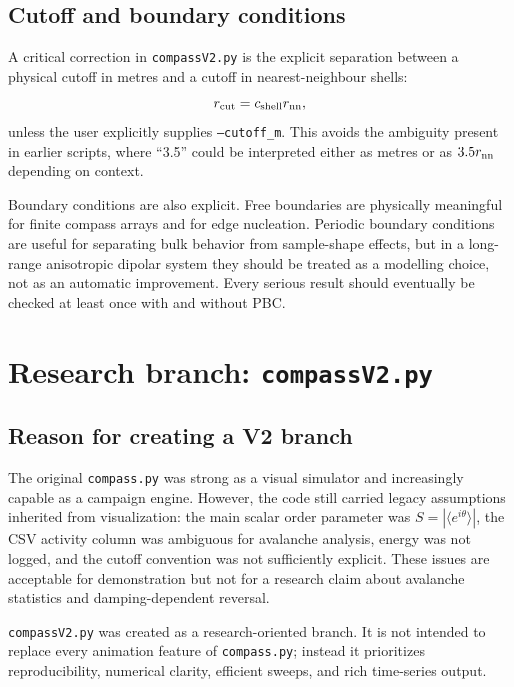 \documentclass[11pt,a4paper]{article}
\newcommand{\code}[1]{\texttt{#1}}
\begin{document}
\subsection{Cutoff and boundary conditions}

A critical correction in \code{compassV2.py} is the explicit separation between a physical cutoff in metres and a cutoff in nearest-neighbour shells:
\begin{equation}
r_{\rm cut} = c_{\rm shell} r_{\rm nn},
\end{equation}
unless the user explicitly supplies \code{--cutoff\_m}. This avoids the ambiguity present in earlier scripts, where ``3.5'' could be interpreted either as metres or as $3.5r_{\rm nn}$ depending on context.

Boundary conditions are also explicit. Free boundaries are physically meaningful for finite compass arrays and for edge nucleation. Periodic boundary conditions are useful for separating bulk behavior from sample-shape effects, but in a long-range anisotropic dipolar system they should be treated as a modelling choice, not as an automatic improvement. Every serious result should eventually be checked at least once with and without PBC.

\section{Research branch: \code{compassV2.py}}
\label{sec:compassv2}

\subsection{Reason for creating a V2 branch}

The original \code{compass.py} was strong as a visual simulator and increasingly capable as a campaign engine. However, the code still carried legacy assumptions inherited from visualization: the main scalar order parameter was $S=|\langle e^{i\theta}\rangle|$, the CSV activity column was ambiguous for avalanche analysis, energy was not logged, and the cutoff convention was not sufficiently explicit. These issues are acceptable for demonstration but not for a research claim about avalanche statistics and damping-dependent reversal.

\code{compassV2.py} was created as a research-oriented branch. It is not intended to replace every animation feature of \code{compass.py}; instead it prioritizes reproducibility, numerical clarity, efficient sweeps, and rich time-series output.
\end{document}
